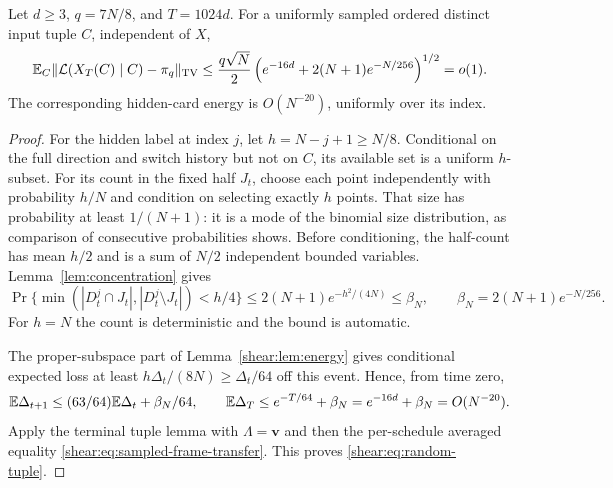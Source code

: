 \begin{proposition}
\label{shear:prop:random-tuple}
Let $d\ge3$, $q=7N/8$, and $T=1024d$. For a uniformly sampled
ordered distinct input tuple $C$, independent of $X$,
\begin{equation}\label{shear:eq:random-tuple}
 \mathbb E_C\|\mathcal L(X_T(C)\mid C)-\pi_q\|_{\mathrm{TV}}
 \le\frac{q\sqrt N}{2}
 \left(e^{-16d}+2(N+1)e^{-N/256}\right)^{1/2}=o(1).
\end{equation}
The corresponding hidden-card energy is $O(N^{-20})$,
uniformly over its index.
\end{proposition}
\begin{proof}
For the hidden label at index $j$, let $h=N-j+1\ge N/8$.
Conditional on the full direction and switch history but not
on $C$, its available set is a uniform $h$-subset. For its
count in the fixed half $J_t$, choose each point independently
with probability $h/N$ and condition on selecting exactly
$h$ points. That size has probability at least $1/(N+1)$:
it is a mode of the binomial size distribution, as comparison
of consecutive probabilities shows. Before conditioning, the
half-count has mean $h/2$ and is a sum of $N/2$ independent
bounded variables. Lemma~\ref{lem:concentration} gives
\begin{equation}\label{shear:eq:sample-balance}
 \Pr\{\min(|D_t^j\cap J_t|,|D_t^j\setminus J_t|)<h/4\}
 \le2(N+1)e^{-h^2/(4N)}
 \le\beta_N,\qquad
 \beta_N=2(N+1)e^{-N/256}.
\end{equation}
For $h=N$ the count is deterministic and the bound is automatic.

The proper-subspace part of Lemma~\ref{shear:lem:energy}
gives conditional expected loss at least
$h\Delta_t/(8N)\ge\Delta_t/64$ off this event. Hence, from
time zero,
\[
 \mathbb E\Delta_{t+1}\le(63/64)\mathbb E\Delta_t+\beta_N/64,\qquad
 \mathbb E\Delta_T\le e^{-T/64}+\beta_N
             =e^{-16d}+\beta_N=O(N^{-20}).
\]
Apply the terminal tuple lemma with $\Lambda=\mathbf v$ and
then the per-schedule averaged equality
\eqref{shear:eq:sampled-frame-transfer}. This proves
\eqref{shear:eq:random-tuple}.
\end{proof}

